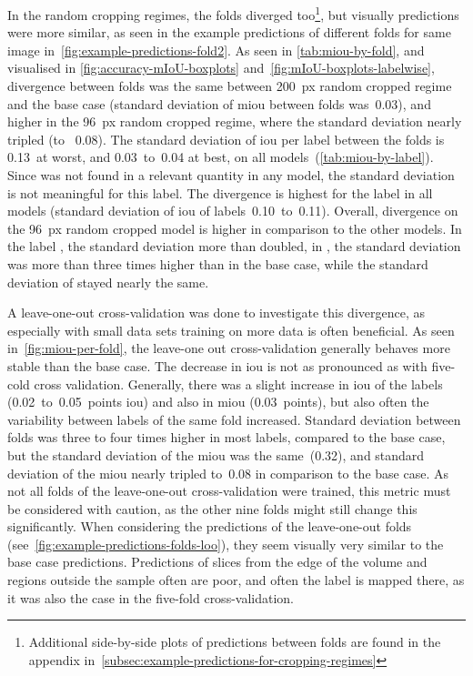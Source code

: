 In the random cropping regimes, the folds diverged too\footnote{Additional side-by-side plots of predictions between folds are found in the appendix in~\autoref{subsec:example-predictions-for-cropping-regimes}}, but visually predictions were more similar, as seen in the example predictions of different folds for same image in~\autoref{fig:example-predictions-fold2}.
As seen in \autoref{tab:miou-by-fold}, and visualised in \autoref{fig:accuracy-mIoU-boxplots} and~\ref{fig:mIoU-boxplots-labelwise}, divergence between folds was the same between 200~px random cropped regime and the base case (standard deviation of \gls{miou} between folds was~0.03), and higher in the 96~px random cropped regime, where the standard deviation nearly tripled (to ~0.08).
The standard deviation of \gls{iou} per label between the folds is 0.13~at worst, and 0.03~to~0.04 at best, on all models~(\autoref{tab:miou-by-label}).
Since  was not found in a relevant quantity in any model, the standard deviation is not meaningful for this label.
The divergence is highest for the label  in all models (standard deviation of \gls{iou} of labels~0.10~to~0.11).
Overall, divergence on the 96~px random cropped model is higher in comparison to the other models.
In the label , the standard deviation more than doubled, in , the standard deviation was more than three times higher than in the base case, while the standard deviation of  stayed nearly the same.

A leave-one-out cross-validation was done to investigate this divergence, as especially with small data sets training on more data is often beneficial.
As seen in~\autoref{fig:miou-per-fold}, the leave-one out cross-validation generally behaves more stable than the base case.
The decrease in \gls{iou} is not as pronounced as with five-cold cross validation.
Generally, there was a slight increase in \gls{iou} of the labels (0.02~to~0.05~points \gls{iou}) and also in \gls{miou} (0.03~points), but also often the variability between labels of the same fold increased.
Standard deviation between folds was three to four times higher in most labels, compared to the base case, but the standard deviation of the \gls{miou} was the same~(0.32), and standard deviation of the \gls{miou} nearly tripled to~0.08 in comparison to the base case.
As not all folds of the leave-one-out cross-validation were trained, this metric must be considered with caution, as the other nine folds might still change this significantly.
When considering the predictions of the leave-one-out folds (see~\autoref{fig:example-predictions-folds-loo}), they seem visually very similar to the base case predictions.
Predictions of slices from the edge of the volume and regions outside the sample often are poor, and often the  label is mapped there, as it was also the case in the five-fold cross-validation.


